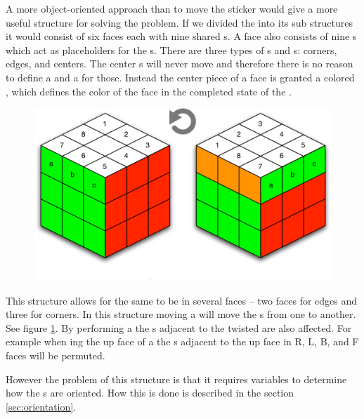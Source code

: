 A more object-oriented approach than to move the sticker would give a more useful structure for solving the problem.
If we divided the \rubik{} into its sub structures it would consist of six faces each with nine shared \cubie{}s.
A face also consists of nine \cubicle{}s which act as placeholders for the \cpiece{}s. 
There are three types of \cpiece{}s and \cubicle{}s: corners, edges, and centers. 
The center \cpiece{}s will never move and therefore there is no reason to define a \cubicle{} and a \cpiece{} for those. Instead the center piece of a face is granted a colored \facelet{}, which defines the color of the face in the completed state of the \rubik{}.
\begin{figure}[h]
	\centering
		\includegraphics[scale=0.5]{input/pics/twistOfUpFace}
	\caption{}
	\label{fig:twistOfUpFace}
\end{figure}
This structure allows for the same \cubicle{} to be in several faces -- two faces for edges and three for corners. 
In this structure moving a \face{} will move the \cpiece{}s from one \cubicle{} to another. See figure \ref{fig:twistOfUpFace}. By performing a \twist{} the \face{}s adjacent to the twisted \face{} are also affected. 
For example when \twist{}ing the up face of a \rubik{} the \cubie{}s adjacent to the up face in R, L, B, and F faces will be permuted.

However the problem of this structure is that it requires variables to determine how the \cubie{}s are oriented. 
How this is done is described in the section \ref{sec:orientation}.

	
	